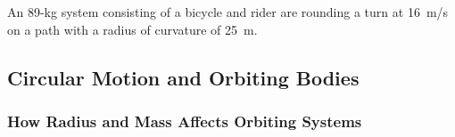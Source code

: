 \documentclass[../main-physics-workbook.tex]{subfiles}
\begin{document}
\begin{questions}
\question \label{Kv8Old} %
An 89-kg system consisting of a bicycle and rider are rounding a turn at \SI{16}{m/s} on a path with a radius of curvature of \SI{25}{m}. 





\end{questions}


\subsection{Circular Motion and Orbiting Bodies}

\subsubsection{How Radius and Mass Affects Orbiting Systems}
\end{document}
